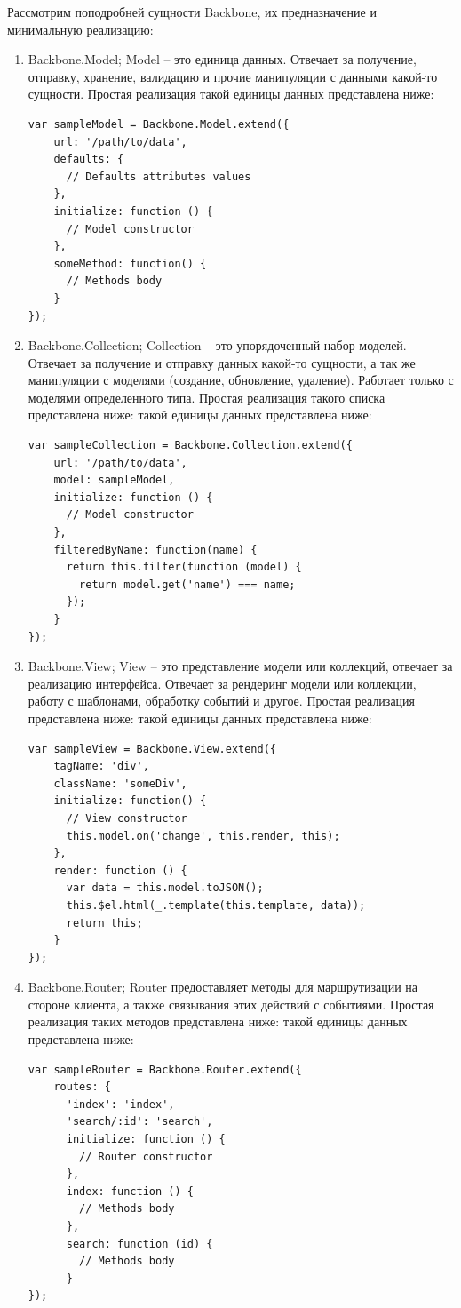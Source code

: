 Рассмотрим поподробней сущности Backbone, их предназначение и минимальную реализацию:
\begin{enumerate}
\item Backbone.Model; Model  -- это единица данных. Отвечает за получение, отправку, хранение, валидацию и прочие манипуляции с данными какой-то сущности. Простая реализация такой единицы данных представлена ниже\cite{backdoc}:
\begin{lstlisting}[basicstyle=\normalsize]
var sampleModel = Backbone.Model.extend({
    url: '/path/to/data',
    defaults: {
      // Defaults attributes values
    },
    initialize: function () {
      // Model constructor
    },
    someMethod: function() {
      // Methods body
    }
});
\end{lstlisting}

\item Backbone.Collection; Collection -- это упорядоченный набор  моделей. Отвечает за получение и отправку данных какой-то сущности, а так же манипуляции с моделями (создание, обновление, удаление). Работает только с моделями определенного типа. Простая реализация такого списка представлена ниже:
такой единицы данных представлена ниже\cite{backdoc}:
\begin{lstlisting}[basicstyle=\normalsize]
var sampleCollection = Backbone.Collection.extend({
    url: '/path/to/data',
    model: sampleModel,
    initialize: function () {
      // Model constructor
    },
    filteredByName: function(name) {
      return this.filter(function (model) {
        return model.get('name') === name;
      });
    }
});
\end{lstlisting}

\item Backbone.View; View -- это представление модели или коллекций, отвечает за реализацию интерфейса. Отвечает за рендеринг модели или коллекции, работу с шаблонами, обработку событий и другое. Простая реализация представлена ниже:
такой единицы данных представлена ниже\cite{backdoc}:
\begin{lstlisting}[basicstyle=\normalsize]
var sampleView = Backbone.View.extend({
    tagName: 'div',
    className: 'someDiv',
    initialize: function() {
      // View constructor
      this.model.on('change', this.render, this);
    },
    render: function () {
      var data = this.model.toJSON();
      this.$el.html(_.template(this.template, data));
      return this;
    }
});
\end{lstlisting}

\item Backbone.Router; Router предоставляет методы для маршрутизации на стороне клиента, а также связывания этих действий с событиями. Простая реализация таких методов представлена ниже:
такой единицы данных представлена ниже\cite{backdoc}:
\begin{lstlisting}[basicstyle=\normalsize]
var sampleRouter = Backbone.Router.extend({
    routes: {
      'index': 'index',
      'search/:id': 'search',
      initialize: function () {
        // Router constructor
      },
      index: function () {
        // Methods body
      },
      search: function (id) {
        // Methods body
      }
});
\end{lstlisting}


\end{enumerate}
